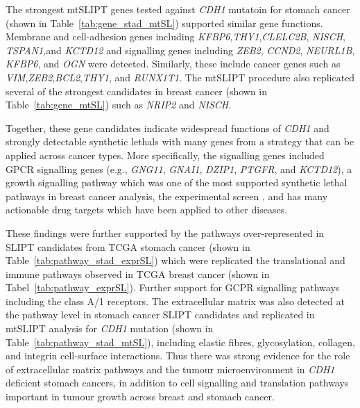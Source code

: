 The strongest \acrshort{mtSLIPT} genes tested against \textit{CDH1} mutatoin for stomach cancer (shown in Table~\ref{tab:gene_stad_mtSL}) supported similar gene functions. Membrane and cell-adhesion genes including \textit{KFBP6},\textit{THY1},\textit{CLELC2B}, \textit{NISCH}, \textit{TSPAN1},and \textit{KCTD12} and signalling genes including \textit{ZEB2}, \textit{CCND2}, \textit{NEURL1B}, \textit{KFBP6}, and \textit{OGN} were detected. Similarly, these include cancer genes such as \textit{VIM},\textit{ZEB2},\textit{BCL2},\textit{THY1}, and \textit{RUNX1T1}. The \acrshort{mtSLIPT} procedure also replicated several of the strongest candidates in breast cancer (shown in Table~\ref{tab:gene_mtSL}) such as \textit{NRIP2} and \textit{NISCH}.

Together, these gene candidates indicate widespread functions of \textit{CDH1} and strongly detectable \glspl{synthetic lethal} with many genes from a strategy that can be applied across cancer types. More specifically, the signalling genes included \gls{GPCR} signalling genes (e.g., \textit{GNG11}, \textit{GNAI1}, \textit{DZIP1}, \textit{PTGFR}, and \textit{KCTD12}), a growth signalling pathway which was one of the most supported \gls{synthetic lethal} pathways in breast cancer analysis, the experimental screen \citep{Telford2015}, and has many actionable drug targets which have been applied to other diseases.

These findings were further supported by the pathways over-represented in \gls{SLIPT} candidates from \gls{TCGA} stomach cancer (shown in Table~\ref{tab:pathway_stad_exprSL}) which were replicated the translational and immune pathways observed in \gls{TCGA} breast cancer (shown in Tabel~\ref{tab:pathway_exprSL}). Further support for GCPR signalling pathways including the class A/1 receptors. The extracellular matrix was also detected at the pathway level in stomach cancer \gls{SLIPT} candidates and replicated in \acrshort{mtSLIPT} analysis for \textit{CDH1} \gls{mutation} (shown in Table~\ref{tab:pathway_stad_mtSL}), including elastic fibres, glycosylation, collagen, and integrin cell-surface interactions. Thus there was strong evidence for the role of extracellular matrix pathways and the tumour microenvironment in \textit{CDH1} deficient stomach cancers, in addition to cell signalling and translation pathways important in tumour growth across breast and stomach cancer.





\FloatBarrier

